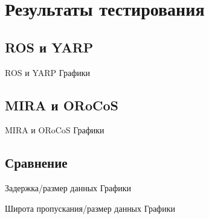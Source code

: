 \section{Результаты тестирования}

\subsection{ROS и YARP}
\begin{frame}{ROS и YARP}
	Графики
\end{frame}

\subsection{MIRA и ORoCoS}
\begin{frame}{MIRA и ORoCoS}
Графики
\end{frame}

\subsection{Сравнение}
\begin{frame}{Задержка/размер данных}
Графики
\end{frame}

\begin{frame}{Широта пропускания/размер данных}
Графики
\end{frame}
